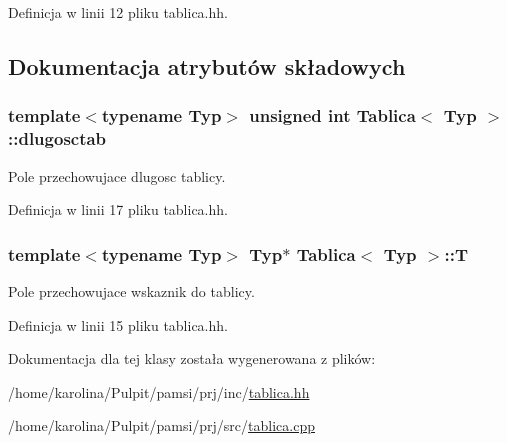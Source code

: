 Definicja w linii 12 pliku tablica.\-hh.



\subsection{Dokumentacja atrybutów składowych}
\hypertarget{class_tablica_a42b49425f0e086c4e958337dcba3a3b6}{
\subsubsection[{dlugosctab}]{\setlength{\rightskip}{0pt plus 5cm}template$<$typename Typ$>$ unsigned int {\bf Tablica}$<$ Typ $>$\-::dlugosctab}}\label{class_tablica_a42b49425f0e086c4e958337dcba3a3b6}


Pole przechowujace dlugosc tablicy. 



Definicja w linii 17 pliku tablica.\-hh.

\hypertarget{class_tablica_a8a186bd43f434e2c8b58377f6a54ab47}{
\subsubsection[{T}]{\setlength{\rightskip}{0pt plus 5cm}template$<$typename Typ$>$ Typ$\ast$ {\bf Tablica}$<$ Typ $>$\-::T}}\label{class_tablica_a8a186bd43f434e2c8b58377f6a54ab47}


Pole przechowujace wskaznik do tablicy. 



Definicja w linii 15 pliku tablica.\-hh.



Dokumentacja dla tej klasy została wygenerowana z plików\-:\begin{DoxyCompactItemize}
\item 
/home/karolina/\-Pulpit/pamsi/prj/inc/\hyperlink{tablica_8hh}{tablica.\-hh}\item 
/home/karolina/\-Pulpit/pamsi/prj/src/\hyperlink{tablica_8cpp}{tablica.\-cpp}\end{DoxyCompactItemize}
